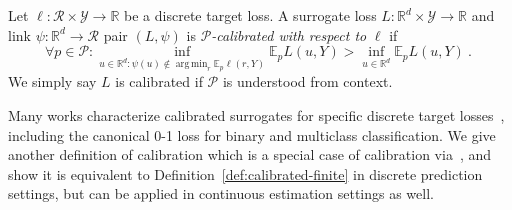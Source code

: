 \documentclass[anon,12pt]{colt2021} %
\newcommand{\reals}{\mathbb{R}}
\newcommand{\E}{\mathbb{E}}
\newcommand{\R}{\mathcal{R}}
\renewcommand{\P}{\mathcal{P}}
\newcommand{\Y}{\mathcal{Y}}
\newcommand{\exploss}[3]{\E_{#3} #1(#2,Y)}
\DeclareMathOperator*{\argmin}{arg\,min}
\begin{document}

\begin{definition}\label{def:calibrated-finite}
	Let $\ell : \R \times \Y \to \reals$ be a discrete target loss.
	A surrogate loss $L : \reals^d \times \Y \to \reals$  and link $\psi:\reals^d \to \R$ pair $(L, \psi)$ is \emph{$\P$-calibrated with respect to} $\ell$ if 
	\begin{equation}\label{eq:calibration}
	\forall p \in \P: \inf_{u \in \reals^d : \psi(u) \not \in \argmin_r \E_p\ell(r,Y)} \exploss{L}{u}{p} > \inf_{u \in \reals^d} \exploss{L}{u}{p}~.~
	\end{equation}
	We simply say $L$ is calibrated if $\P$ is understood from context.
\end{definition}

Many works characterize calibrated surrogates for specific discrete target losses~\citep{zhang2004statistical,lin2004note,bartlett2006convexity,tewari2007consistency}, including the canonical 0-1 loss for binary and multiclass classification.
We give another definition of calibration which is a special case of calibration via~\citet{steinwart2008support}, and show it is equivalent to Definition~\ref{def:calibrated-finite} in discrete prediction settings, but can be applied in continuous estimation settings as well.
\end{document}
